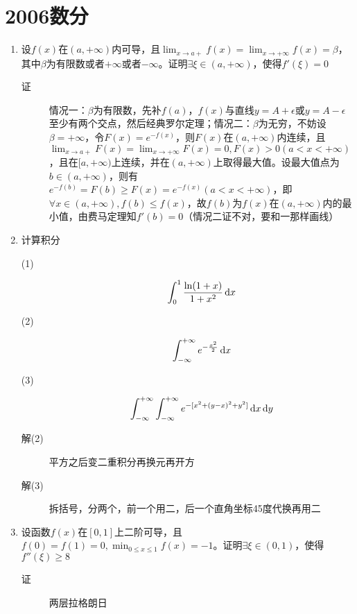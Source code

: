 \section{2006数分}
\begin{enumerate}

\item 设$f(x)$在$(a,+\infty)$内可导，且$\lim_{x \to a+}f(x)=\lim_{x \to +\infty}f(x)=\beta$，其中$\beta$为有限数或者$+\infty$或者$-\infty$。证明$\exists \xi \in (a,+\infty)$，使得$f'(\xi)=0$
\begin{description}
\item[证] 情况一：$\beta$为有限数，先补$f(a)$，$f(x)$与直线$y=A+\epsilon$或$y=A-\epsilon$至少有两个交点，然后经典罗尔定理；情况二：$\beta$为无穷，不妨设$\beta=+\infty$，令$F(x)=e^{-f(x)}$，则$F(x)$在$(a,+\infty)$内连续，且$\lim_{x \to a+}F(x)=\lim_{x \to +\infty}F(x)=0,F(x)>0(a<x<+\infty)$，且在$[a,+\infty)$上连续，并在$(a,+\infty)$上取得最大值。设最大值点为$b\in (a,+\infty)$，则有$e^{-f(b)}=F(b)\geq F(x)= e^{-f(x)}(a<x<+\infty)$，即$\forall x \in (a,+\infty),f(b)\leq f(x)$，故$f(b)$为$f(x)$在$(a,+\infty)$内的最小值，由费马定理知$f'(b)=0$（情况二证不对，要和一那样画线）
\end{description}

\item 计算积分
\begin{description}
\item[(1)]
\[
\int_0^1 \frac{\ln(1+x)}{1+x^2}\,\mathrm{d} x
\]
\item[(2)]
\[
\int_{-\infty}^{+\infty}e^{-\frac{x^2}{2}} \,\mathrm{d} x
\]
\item[(3)]
\[
\int_{-\infty}^{+\infty}\int_{-\infty}^{+\infty}e^{-[x^2+(y-x)^2+y^2]}\,\mathrm{d} x\,\mathrm{d} y
\]
\item[解(2)] 平方之后变二重积分再换元再开方
\item[解(3)] 拆括号，分两个，前一个用二，后一个直角坐标45度代换再用二
\end{description}

\item 设函数$f(x)$在$[0,1]$上二阶可导，且$f(0)=f(1)=0,\min_{0\leq x\leq 1}f(x)=-1$。证明$\exists \xi \in (0,1)$，使得$f''(\xi)\geq 8$
\begin{description}
\item[证] 两层拉格朗日
\end{description}


\end{enumerate}
